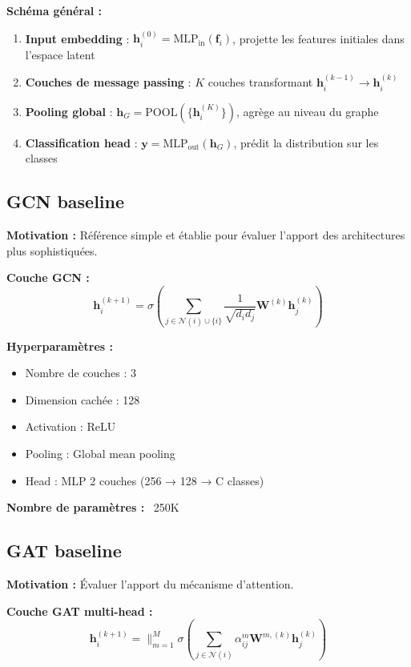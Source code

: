 \textbf{Schéma général :}
\begin{enumerate}
    \item \textbf{Input embedding} : $\mathbf{h}_i^{(0)} = \text{MLP}_{\text{in}}(\mathbf{f}_i)$, projette les features initiales dans l'espace latent
    \item \textbf{Couches de message passing} : $K$ couches transformant $\mathbf{h}_i^{(k-1)} \rightarrow \mathbf{h}_i^{(k)}$
    \item \textbf{Pooling global} : $\mathbf{h}_G = \text{POOL}(\{\mathbf{h}_i^{(K)}\})$, agrège au niveau du graphe
    \item \textbf{Classification head} : $\mathbf{y} = \text{MLP}_{\text{out}}(\mathbf{h}_G)$, prédit la distribution sur les classes
\end{enumerate}

\subsection{GCN baseline}

\textbf{Motivation :}
Référence simple et établie pour évaluer l'apport des architectures plus sophistiquées.

\textbf{Couche GCN :}
\[
\mathbf{h}_i^{(k+1)} = \sigma\left(\sum_{j \in \mathcal{N}(i) \cup \{i\}} \frac{1}{\sqrt{d_i d_j}} \mathbf{W}^{(k)}\mathbf{h}_j^{(k)}\right)
\]

\textbf{Hyperparamètres :}
\begin{itemize}
    \item Nombre de couches : 3
    \item Dimension cachée : 128
    \item Activation : ReLU
    \item Pooling : Global mean pooling
    \item Head : MLP 2 couches (256 → 128 → C classes)
\end{itemize}

\textbf{Nombre de paramètres :} ~250K

\subsection{GAT baseline}

\textbf{Motivation :}
Évaluer l'apport du mécanisme d'attention.

\textbf{Couche GAT multi-head :}
\[
\mathbf{h}_i^{(k+1)} = \|_{m=1}^M \sigma\left(\sum_{j \in \mathcal{N}(i)} \alpha_{ij}^m \mathbf{W}^{m,(k)}\mathbf{h}_j^{(k)}\right)
\]

